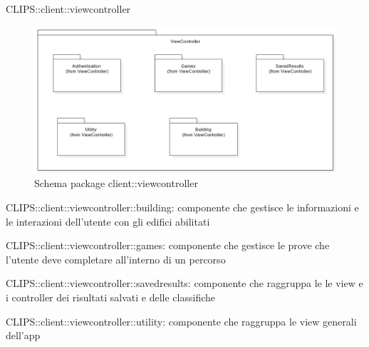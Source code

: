\begin{componente}{CLIPS::client::viewcontroller}
\begin{figure}[h!]
\centering
\includegraphics[scale=0.5]{img/package/png/client--viewcontroller.png}
\caption{Schema package client::viewcontroller}
 \end{figure}
\begin{compPackageContenuti}
\item CLIPS::client::viewcontroller::building: componente che gestisce le informazioni e le interazioni dell'utente con gli edifici abilitati
\item CLIPS::client::viewcontroller::games: componente che gestisce le prove che l'utente deve completare all'interno di un percorso
\item CLIPS::client::viewcontroller::savedresults: componente che raggruppa le le view e i controller dei risultati salvati e delle classifiche
\item CLIPS::client::viewcontroller::utility: componente che raggruppa le view generali dell'app
\end{compPackageContenuti}
\end{componente}
